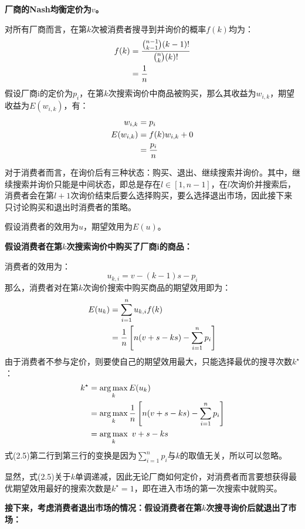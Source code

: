
\question
\textbf{厂商的Nash均衡定价为$v$。}

对所有厂商而言，在第$k$次被消费者搜寻到并询价的概率$f(k)$均为：
\begin{align}
     f(k) &= \frac{\binom{n-1}{k-1}(k-1)!}{\binom{n}{k}(k)!}  \notag\\   
     &=\frac{1}{n}
\end{align}
假设厂商i的定价为$p_i$，在第$k$次搜索询价中商品被购买，那么其收益为$w_{i,k}$，期望收益为$E(w_{i,k})$，有：
\begin{align}
    w_{i,k} &= p_i \notag \\ 
    E(w_{i,k}) &= f(k)w_{i,k} +0 \notag \\
    &=\frac{p_i}{n}
\end{align}


对于消费者而言，在询价后有三种状态：购买、退出、继续搜索并询价。其中，继续搜索并询价只能是中间状态，即总是存在$l\in [1,n-1]$，在$l$次询价并搜索后，消费者会在第$l+1$次询价结束后要么选择购买，要么选择退出市场，因此接下来只讨论购买和退出时消费者的策略。

假设消费者的效用为$u$，期望效用为$E(u)$。


\textbf{假设消费者在第$k$次搜索询价中购买了厂商i的商品：}

消费者的效用为：
\begin{equation}
    u_{k,i}=v-(k-1)s-p_i
\end{equation}
那么，消费者对在第$k$次询价搜索中购买商品的期望效用即为：
\begin{align}
    E(u_k) &= \sum_{i=1}^{n}u_{k,i}f(k) \notag\\
    &=\frac{1}{n}\left[n(v+s-ks)-\sum_{i=1}^np_i\right] 
\end{align}
由于消费者不参与定价，则要使自己的期望效用最大，只能选择最优的搜寻次数$k^{\star}$：
\begin{align}
    k^{\star} &= \mathop{\arg\max}\limits_k E(u_k) \notag\\
    &= \mathop{\arg\max}\limits_k \frac{1}{n}\left[n(v+s-ks)-\sum_{i=1}^np_i\right] \notag \\
    &=\mathop{\arg\max}\limits_k \ v+s-ks
\end{align}
式(2.5)第二行到第三行的变换是因为$\sum_{i=1}^np_i$与$k$的取值无关，所以可以忽略。


显然，式(2.5)关于$k$单调递减，因此无论厂商如何定价，对消费者而言要想获得最优期望效用最好的搜索次数是$k^{\star}=1$，即在进入市场的第一次搜索中就购买。


\textbf{接下来，考虑消费者退出市场的情况：假设消费者在第$k$次搜寻询价后就退出了市场：}

